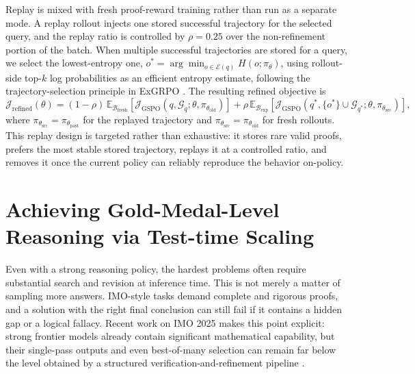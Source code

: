 \documentclass{llmxive}
\begin{document}
Replay is mixed with fresh proof-reward training rather than run as a separate
mode. A replay rollout injects one stored successful trajectory for the selected
query, and the replay ratio is controlled by $\rho=0.25$ over the non-refinement
portion of the batch. When multiple successful trajectories are stored for a
query, we select the lowest-entropy one, $o^*=\arg\min_{o\in\mathcal{E}(q)}
H(o;\pi_\theta)$, using rollout-side top-$k$ log probabilities as an efficient
entropy estimate, following the trajectory-selection principle in ExGRPO
\citep{exgrpo}. The resulting refined objective is
\begin{equation}
\mathcal{J}_{\mathrm{refined}}(\theta)=
(1-\rho)\,\mathbb{E}_{\mathcal{B}_{\mathrm{fresh}}}
\left[\mathcal{J}_{\mathrm{GSPO}}(q,\mathcal{G}_q;\theta,\pi_{\theta_{\mathrm{old}}})\right]
+\rho\,\mathbb{E}_{\mathcal{B}_{\mathrm{exp}}}
\left[\mathcal{J}_{\mathrm{GSPO}}(q^*,\{o^*\}\cup\mathcal{G}_{q^*};\theta,\pi_{\theta_{\mathrm{src}}})\right],
\label{eq:refined-replay-objective}
\end{equation}
where $\pi_{\theta_{\mathrm{src}}}=\pi_{\theta_{\mathrm{past}}}$ for the replayed
trajectory and $\pi_{\theta_{\mathrm{src}}}=\pi_{\theta_{\mathrm{old}}}$ for fresh
rollouts. This replay design is targeted rather than exhaustive: it stores rare
valid proofs, prefers the most stable stored trajectory, replays it at a
controlled ratio, and removes it once the current policy can reliably reproduce
the behavior on-policy.

\section{Achieving Gold-Medal-Level Reasoning via Test-time Scaling}
\label{sec:tts}

Even with a
strong reasoning policy, the hardest problems often require substantial search
and revision at inference time. This is not merely a matter of sampling more
answers. IMO-style tasks demand complete and rigorous proofs, and a solution
with the right final conclusion can still fail if it contains a hidden gap or a
logical fallacy. Recent work on IMO 2025 makes this point explicit: strong
frontier models already contain significant mathematical capability, but their
single-pass outputs and even best-of-many selection can remain far below the
level obtained by a structured verification-and-refinement pipeline
\citep{huang2025winning}. 
\end{document}
